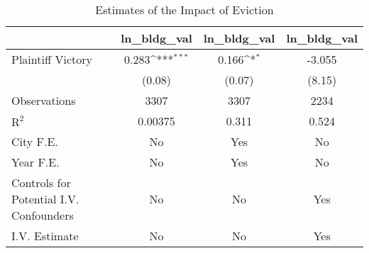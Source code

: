 \begin{table}[htbp]\centering
\def\sym#1{\ifmmode^{#1}\else\(^{#1}\)\fi}
\caption{Estimates of the Impact of Eviction}
\begin{tabular}{l*{3}{c}}
\toprule
                    &\multicolumn{1}{c}{ln\_bldg\_val}&\multicolumn{1}{c}{ln\_bldg\_val}&\multicolumn{1}{c}{ln\_bldg\_val}\\
\midrule
Plaintiff Victory   &       0.283\sym{***}&       0.166\sym{*}  &      -3.055         \\
                    &      (0.08)         &      (0.07)         &      (8.15)         \\
\midrule
Observations        &        3307         &        3307         &        2234         \\
$\text{R}^2$        &     0.00375         &       0.311         &       0.524         \\
City F.E.           &          No         &         Yes         &          No         \\
Year F.E.           &          No         &         Yes         &          No         \\
Controls for Potential I.V. Confounders&          No         &          No         &         Yes         \\
I.V. Estimate       &          No         &          No         &         Yes         \\
\bottomrule
\end{tabular}
\end{table}
